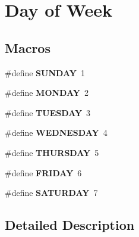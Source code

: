 \hypertarget{group___day__of___week}{\section{Day of Week}
\label{group___day__of___week}
}
\subsection*{Macros}
\begin{DoxyCompactItemize}
\item 
\hypertarget{group___day__of___week_ga6764dc0bd7e59b4eca8d525f8136fd86}{\#define {\bfseries S\-U\-N\-D\-A\-Y}~1}\label{group___day__of___week_ga6764dc0bd7e59b4eca8d525f8136fd86}

\item 
\hypertarget{group___day__of___week_ga7170de6ea0ab27a44b607e025eeda10b}{\#define {\bfseries M\-O\-N\-D\-A\-Y}~2}\label{group___day__of___week_ga7170de6ea0ab27a44b607e025eeda10b}

\item 
\hypertarget{group___day__of___week_ga7e614639937b5dc668fb843882ddf895}{\#define {\bfseries T\-U\-E\-S\-D\-A\-Y}~3}\label{group___day__of___week_ga7e614639937b5dc668fb843882ddf895}

\item 
\hypertarget{group___day__of___week_gabc50400fb4fc6d0b982a22b5e9644a8c}{\#define {\bfseries W\-E\-D\-N\-E\-S\-D\-A\-Y}~4}\label{group___day__of___week_gabc50400fb4fc6d0b982a22b5e9644a8c}

\item 
\hypertarget{group___day__of___week_ga4383b2bef864f3be7c45bdbfced40e4d}{\#define {\bfseries T\-H\-U\-R\-S\-D\-A\-Y}~5}\label{group___day__of___week_ga4383b2bef864f3be7c45bdbfced40e4d}

\item 
\hypertarget{group___day__of___week_gabe9db6f3a1fb60fa435c899c00dd0987}{\#define {\bfseries F\-R\-I\-D\-A\-Y}~6}\label{group___day__of___week_gabe9db6f3a1fb60fa435c899c00dd0987}

\item 
\hypertarget{group___day__of___week_gab211cb1e7ca439c7d2c6cc675b0dcc88}{\#define {\bfseries S\-A\-T\-U\-R\-D\-A\-Y}~7}\label{group___day__of___week_gab211cb1e7ca439c7d2c6cc675b0dcc88}

\end{DoxyCompactItemize}


\subsection{Detailed Description}
